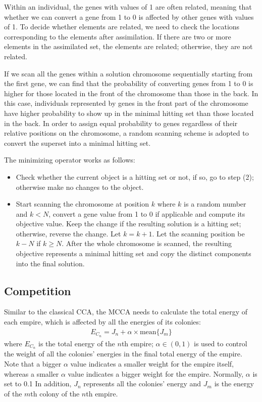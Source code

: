Within an individual, the genes with values of 1 are often related, meaning that whether we can convert a gene from 1 to 0 is affected by other genes with values of 1.
To decide whether elements are related, we need to check the locations corresponding to the elements after assimilation.
If there are two or more elements in the assimilated set, the elements are related; otherwise, they are not related.

If we scan all the genes within a solution chromosome sequentially starting from the first gene, we can find that the probability of converting genes from 1 to 0 is higher for those located in the front of the chromosome than those in the back.
In this case, individuals represented by genes in the front part of the chromosome have higher probability to show up in the minimal hitting set than those located in the back.
In order to assign equal probability to genes regardless of their relative positions on the chromosome, a random scanning scheme is adopted to convert the superset into a minimal hitting set.

The minimizing operator works as follows:
\begin{itemize}
	\item Check whether the current object is  a hitting set or not, if so, go to step (2); otherwise make no changes to the object.
	\item Start scanning the chromosome at position $k$ where $k$ is a random number and $k < N$, convert a gene value from 1 to 0 if applicable and compute its objective value. Keep the change if the resulting solution is a hitting set; otherwise, reverse the change. Let $k = k + 1$. Let the scanning position be $k - N$ if $k \geq N$. After the whole chromosome is scanned, the resulting objective represents a minimal hitting set and copy the distinct components into the final solution.
\end{itemize}


\subsection{Competition}
Similar to the classical CCA, the MCCA needs to calculate the total energy of each empire, which is affected by all the energies of its colonies:
\begin{align}
	E_{C_n} = J_n + \alpha \times \text{mean}\{J_m\}
\end{align}
where $E_{C_n}$ is the total energy of the $n$th empire; $\alpha \in (0, 1)$ is used to control the weight of all the colonies' energies in the final total energy of the empire.
Note that a bigger $\alpha$ value indicates a smaller weight for the empire itself, whereas a smaller $\alpha$ value indicates a bigger weight for the empire.
Normally, $\alpha$ is set to 0.1
In addition, $J_n$ represents all the colonies' energy and $J_m$ is the energy of the $m$th colony of the $n$th empire.

